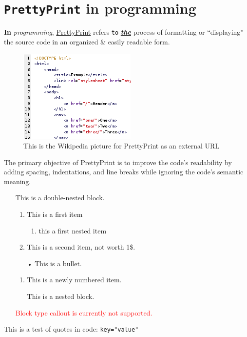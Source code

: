 \documentclass[12pt, a4paper]{article}
\makeatletter
\def\maxwidth#1{\ifdim\Gin@nat@width>#1 #1\else\Gin@nat@width\fi}
\makeatother
\begin{document}
\section{\texttt{PrettyPrint} in programming}
\textbf{In} \textit{programming}, \underline{PrettyPrint} \sout{refers} \texttt{to} \underline{\textbf{\textit{the}}} process of formatting or \enquote{displaying} the source code in an organized \& easily readable form. 
 

\begin{figure}[h]
\includegraphics[width=\maxwidth{\linewidth}]{220px-HTML_source_code_example.png}
\centering
\caption{This is the Wikipedia picture for PrettyPrint as an external URL}
\end{figure}
The primary objective of PrettyPrint is to improve the code's readability by adding spacing, indentations, and line breaks while ignoring the code's semantic meaning.

\begin{itemize}
\item[ ] This is a double-nested block.

\begin{enumerate}
\item This is a first item
\begin{enumerate}
\item this a first nested item
\end{enumerate}
\item This is a second item, not worth 1\$.
\end{enumerate}
\begin{itemize}
\item[•] This is a bullet.
\end{itemize}
\begin{enumerate}
\item This is a newly numbered item.
\item[ ] This is a nested block.

\end{enumerate}
\end{itemize}
\begin{itemize}
\item[ ] \textcolor{red}{Block type callout is currently not supported.}

\end{itemize}
This is a test of quotes in code: \texttt{key="value"}
\end{document}
